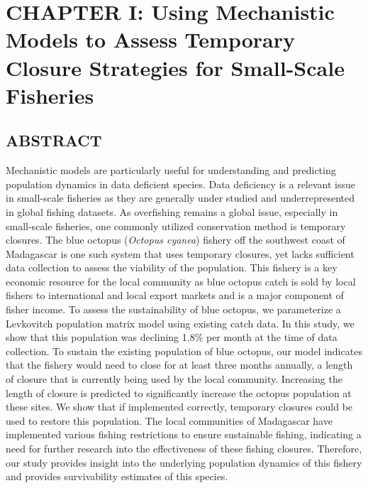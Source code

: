 \documentclass[
  12pt,
]{article}
\begin{document}
\newpage

\hypertarget{chapter-i-using-mechanistic-models-to-assess-temporary-closure-strategies-for-small-scale-fisheries}{%
\section{CHAPTER I: Using Mechanistic Models to Assess Temporary Closure Strategies for Small-Scale Fisheries}\label{chapter-i-using-mechanistic-models-to-assess-temporary-closure-strategies-for-small-scale-fisheries}}

\hypertarget{abstract-1}{%
\subsection{ABSTRACT}\label{abstract-1}}

Mechanistic models are particularly useful for understanding and predicting population dynamics in data deficient species. Data deficiency is a relevant issue in small-scale fisheries as they are generally under studied and underrepresented in global fishing datasets. As overfishing remains a global issue, especially in small-scale fisheries, one commonly utilized conservation method is temporary closures. The blue octopus (\emph{Octopus cyanea}) fishery off the southwest coast of Madagascar is one such system that uses temporary closures, yet lacks sufficient data collection to assess the viability of the population. This fishery is a key economic resource for the local community as blue octopus catch is sold by local fishers to international and local export markets and is a major component of fisher income. To assess the sustainability of blue octopus, we parameterize a Levkovitch population matrix model using existing catch data. In this study, we show that this population was declining 1.8\% per month at the time of data collection. To sustain the existing population of blue octopus, our model indicates that the fishery would need to close for at least three months annually, a length of closure that is currently being used by the local community. Increasing the length of closure is predicted to significantly increase the octopus population at these sites. We show that if implemented correctly, temporary closures could be used to restore this population. The local communities of Madagascar have implemented various fishing restrictions to ensure sustainable fishing, indicating a need for further research into the effectiveness of these fishing closures. Therefore, our study provides insight into the underlying population dynamics of this fishery and provides survivability estimates of this species.
\end{document}
